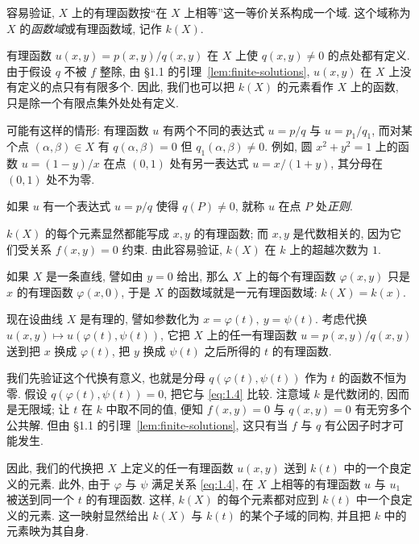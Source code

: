 \begin{definition}[函数域]\label{def:function-field}
	容易验证, $X$ 上的有理函数按``在 $X$ 上相等''这一等价关系构成一个域. 这个域称为 $X$ 的\emph{函数域}或有理函数域, 记作 $k(X)$.
\end{definition}

有理函数 $u(x,y) = p(x,y)/q(x,y)$ 在 $X$ 上使 $q(x,y) \ne 0$ 的点处都有定义. 由于假设 $q$ 不被 $f$ 整除, 由 §1.1 的引理~\ref{lem:finite-solutions}, $u(x,y)$ 在 $X$ 上没有定义的点只有有限多个. 因此, 我们也可以把 $k(X)$ 的元素看作 $X$ 上的函数, 只是除一个有限点集外处处有定义.

可能有这样的情形: 有理函数 $u$ 有两个不同的表达式 $u = p/q$ 与 $u = p_1/q_1$, 而对某个点 $(\alpha, \beta) \in X$ 有 $q(\alpha, \beta) = 0$ 但 $q_1(\alpha, \beta) \ne 0$. 例如, 圆 $x^2 + y^2 = 1$ 上的函数 $u = (1-y)/x$ 在点 $(0,1)$ 处有另一表达式 $u = x/(1+y)$, 其分母在 $(0,1)$ 处不为零.

\begin{definition}[在一点正则]\label{def:regular-at-point}
	如果 $u$ 有一个表达式 $u = p/q$ 使得 $q(P) \ne 0$, 就称 $u$ 在点 $P$ 处\emph{正则}.
\end{definition}

$k(X)$ 的每个元素显然都能写成 $x, y$ 的有理函数; 而 $x, y$ 是代数相关的, 因为它们受关系 $f(x,y) = 0$ 约束. 由此容易验证, $k(X)$ 在 $k$ 上的超越次数为 $1$.

如果 $X$ 是一条直线, 譬如由 $y = 0$ 给出, 那么 $X$ 上的每个有理函数 $\varphi(x,y)$ 只是 $x$ 的有理函数 $\varphi(x,0)$, 于是 $X$ 的函数域就是一元有理函数域: $k(X) = k(x)$.

现在设曲线 $X$ 是有理的, 譬如参数化为 $x = \varphi(t),\ y = \psi(t)$. 考虑代换 $u(x,y) \mapsto u(\varphi(t), \psi(t))$, 它把 $X$ 上的任一有理函数 $u = p(x,y)/q(x,y)$ 送到把 $x$ 换成 $\varphi(t)$, 把 $y$ 换成 $\psi(t)$ 之后所得的 $t$ 的有理函数.

我们先验证这个代换有意义, 也就是分母 $q(\varphi(t), \psi(t))$ 作为 $t$ 的函数不恒为零. 假设 $q(\varphi(t), \psi(t)) = 0$, 把它与 \eqref{eq:1.4} 比较. 注意域 $k$ 是代数闭的, 因而是无限域; 让 $t$ 在 $k$ 中取不同的值, 便知 $f(x,y) = 0$ 与 $q(x,y) = 0$ 有无穷多个公共解. 但由 §1.1 的引理~\ref{lem:finite-solutions}, 这只有当 $f$ 与 $q$ 有公因子时才可能发生.

因此, 我们的代换把 $X$ 上定义的任一有理函数 $u(x,y)$ 送到 $k(t)$ 中的一个良定义的元素. 此外, 由于 $\varphi$ 与 $\psi$ 满足关系 \eqref{eq:1.4}, 在 $X$ 上相等的有理函数 $u$ 与 $u_1$ 被送到同一个 $t$ 的有理函数. 这样, $k(X)$ 的每个元素都对应到 $k(t)$ 中一个良定义的元素. 这一映射显然给出 $k(X)$ 与 $k(t)$ 的某个子域的同构, 并且把 $k$ 中的元素映为其自身.

